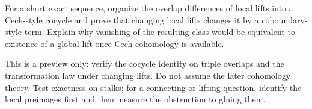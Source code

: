\begin{problem}\label{chal:vi16-05}
For a short exact sequence, organize the overlap differences of local lifts into a Cech-style cocycle and prove that changing local lifts changes it by a coboundary-style term.  Explain why vanishing of the resulting class would be equivalent to existence of a global lift once Cech cohomology is available.
\end{problem}
\begin{hint}
This is a preview only: verify the cocycle identity on triple overlaps and the transformation law under changing lifts.  Do not assume the later cohomology theory. Test exactness on stalks; for a connecting or lifting question, identify the local preimages first and then measure the obstruction to gluing them.
\end{hint}
